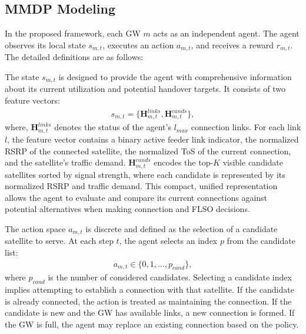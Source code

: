 \subsection{MMDP Modeling}
\quad In the proposed framework, each GW $m$ acts as an independent agent. The agent observes its local state $s_{m,t}$, executes an action $a_{m,t}$, and receives a reward $r_{m,t}$. The detailed definitions are as follows:

The state $s_{m,t}$ is designed to provide the agent with comprehensive information about its current utilization and potential handover targets. It consists of two feature vectors:
\begin{align}
    s_{m,t} = \big\{ \mathbf{H}_{m,t}^{links}, \mathbf{H}_{m,t}^{cands} \big\},
\end{align}
where, $\mathbf{H}_{m,t}^{links}$ denotes the status of the agent's $l_{max}$ connection links. For each link $l$, the feature vector contains a binary active feeder link indicator, the normalized RSRP of the connected satellite, the normalized ToS of the current connection, and the satellite's traffic demand. $\mathbf{H}_{m,t}^{cands}$ encodes the top-$K$ visible candidate satellites sorted by signal strength, where each candidate is represented by its normalized RSRP and traffic demand. This compact, unified representation allows the agent to evaluate and compare its current connections against potential alternatives when making connection and FLSO decisions.

The action space $a_{m,t}$ is discrete and defined as the selection of a candidate satellite to serve. At each step $t$, the agent selects an index $p$ from the candidate list:
\begin{align}
    a_{m,t} \in \{0, 1, \dots, p_{cand}\},
\end{align}
where $p_{cand}$ is the number of considered candidates. Selecting a candidate index implies attempting to establish a connection with that satellite. If the candidate is already connected, the action is treated as maintaining the connection. If the candidate is new and the GW has available links, a new connection is formed. If the GW is full, the agent may replace an existing connection based on the policy.


